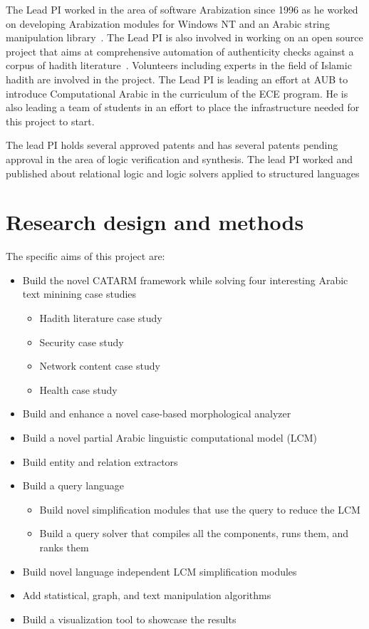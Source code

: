 \documentclass[12pt]{article}
\begin{document}
The Lead PI worked in the area of software Arabization since 1996 
as he worked on developing Arabization modules for Windows NT 
and an Arabic string manipulation library~\cite{Zar96}. 
The Lead PI is also involved in working on an open source 
project that aims at comprehensive automation of authenticity 
checks against a corpus of hadith literature~\cite{Zar06}.
Volunteers including experts in the field of Islamic hadith
are involved in the project.
The Lead PI is leading an effort at AUB to introduce 
Computational Arabic in the curriculum of the ECE program. 
He is also leading a team of students in an effort to place 
the infrastructure needed for this project to start. 

The lead PI holds several approved patents and has several 
patents pending approval in the area of logic verification 
and synthesis.
The lead PI worked and published about relational logic and 
logic solvers applied to structured languages~\cite{seraICSE07,Zara05}

\section{Research design and methods}
\label{s:designmethods}

The specific aims of this project are:
\begin{itemize}
\item Build the novel CATARM framework while solving four interesting Arabic 
text minining case studies
  \begin{itemize}
  \item Hadith literature case study
  \item Security case study
  \item Network content case study
  \item Health case study
  \end{itemize}
\item Build and enhance a novel case-based morphological analyzer
\item Build a novel partial Arabic linguistic computational model (LCM)
\item Build entity and relation extractors
\item Build a query language 
  \begin{itemize}
  \item Build novel simplification modules that use the query to reduce the LCM
  \item Build a query solver that compiles all the components, runs them, and ranks them
  \end{itemize}
\item Build novel language independent LCM simplification modules
\item Add statistical, graph, and text manipulation algorithms
\item Build a visualization tool to showcase the results 
\end{itemize}
\end{document}
